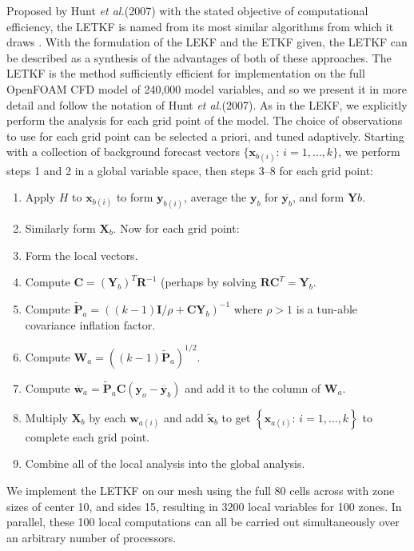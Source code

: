 \documentclass[pre,twocolumn,twoside,byrevtex,superscriptaddress]{revtex4}
\newcommand{\etal}{\textit{et al.}}
\newcommand{\mbx}{\mathbf{x}}
\newcommand{\mby}{\mathbf{y}}
\newcommand{\mbW}{\mathbf{W}}
\newcommand{\mbR}{\mathbf{R}}
\newcommand{\mbP}{\mathbf{P}}
\newcommand{\mbw}{\mathbf{w}}
\newcommand{\mbX}{\mathbf{X}}
\newcommand{\mbY}{\mathbf{Y}}
\begin{document}
Proposed by Hunt \etal (2007) with the stated objective of computational efficiency, the LETKF is named from its most similar algorithms from which it draws \cite{hunt2007efficient}.
With the formulation of the LEKF and the ETKF given, the LETKF can be  described as a synthesis of the advantages of both of these approaches.
The LETKF is the method sufficiently efficient for implementation on the full OpenFOAM CFD model of 240,000 model variables, and so we present it in more detail and follow the notation of Hunt \etal (2007). 
As in the LEKF, we explicitly perform the analysis for each grid point of the model.
The choice of observations to use for each grid point can be selected a priori, and tuned adaptively.
Starting with a collection of background forecast vectors $\{ \mbx_{b(i)}:\,i=1,\ldots,k \}$, we perform steps 1 and 2 in a global variable space, then steps 3--8 for each grid point:
\begin{enumerate}
\item Apply $H$ to $\mbx_{b(i)}$ to form $\mby_{b(i)}$, average the $\mby_b$ for $\overline{\mby_b}$, and form $\mbY b$.
\item Similarly form $\mbX_b$. Now for each grid point:
\item Form the local vectors.
\item Compute $\mathbf{C}=(\mbY_b)^T\mbR^{-1}$ (perhaps by solving $\mbR \mathbf{C}^T = \mbY_b$.
\item Compute $\tilde{\mbP}_a = \left( (k-1)\mathbf{I} / \rho + \mathbf{C} \mbY _b \right ) ^{-1}$ where $\rho > 1$ is a tun-able covariance inflation factor.
\item Compute $\mbW_a = \left ( (k-1) \tilde{\mbP} _a \right ) ^{1/2}$.
\item Compute $\overline{\mbw} _a  = \tilde{\mbP}_a \mathbf{C} \left ( \mby_o - \overline{\mby} _b \right )$ and add it to the column of $\mbW_a$.
\item Multiply $\mbX_b$ by each $\mbw_{a(i)}$ and add $\tilde{\mbx}_b$ to get $\left\{ \mbx_{a(i)}:\,i=1,\ldots,k\right \}$ to complete each grid point.
\item Combine all of the local analysis into the global analysis.
\end{enumerate}
We implement the LETKF on our mesh using the full 80 cells across with zone sizes of center 10, and sides 15, resulting in 3200 local variables for 100 zones.
In parallel, these 100 local computations can all be carried out simultaneously over an arbitrary number of processors.
\end{document}

